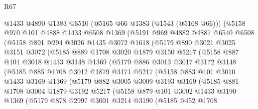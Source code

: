 \begin{lexlean}{R67}
\begin{coremodule}
        @1433
        @4890
        @1383
        @6510
        (@5165 @66 @1383 (@1543 (@5168 @66)))
        (@5158
          @970
          @101
          @4888
          @1433
          @6508
          @1369
          (@5191
            @969
            @4882
            @4887
            @6540
            @6508
            (@5158
              @891
              @294
              @3026
              @1435
              @3072
              @1618
              (@5179
                @890
                @3021
                @3025
                @3151
                @3072
                (@5185
                  @889
                  @1708
                  @3020
                  @1879
                  @3150
                  @5217
                  (@5158
                    @887
                    @101
                    @3018
                    @1433
                    @3148
                    @1369
                    (@5179
                      @886
                      @3013
                      @3017
                      @3172
                      @3148
                      (@5185
                        @885
                        @1708
                        @3012
                        @1879
                        @3171
                        @5217
                        (@5158
                          @883
                          @101
                          @3010
                          @1433
                          @3169
                          @1369
                          (@5179
                            @882
                            @3005
                            @3009
                            @3193
                            @3169
                            (@5185
                              @881
                              @1708
                              @3004
                              @1879
                              @3192
                              @5217
                              (@5158
                                @879
                                @101
                                @3002
                                @1433
                                @3190
                                @1369
                                (@5179
                                  @878
                                  @2997
                                  @3001
                                  @3214
                                  @3190
                                  (@5185
                                    @452
                                    @1708

\end{coremodule}
\end{lexlean}
